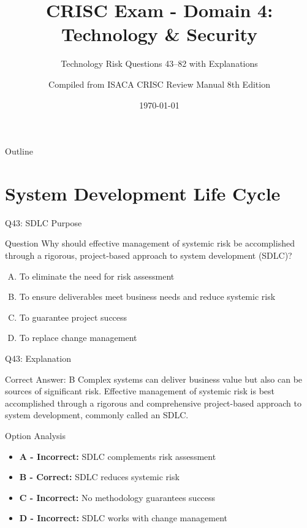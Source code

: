 \documentclass{beamer}
\title{CRISC Exam - Domain 4: Technology \& Security}
\subtitle{Technology Risk Questions 43--82 with Explanations}
\author{Compiled from ISACA CRISC Review Manual 8th Edition}
\date{\today}
\begin{document}
	
	\begin{frame}
		\titlepage
	\end{frame}
	
	\begin{frame}{Outline}
		\tableofcontents
	\end{frame}
	
	
	\section{System Development Life Cycle}
	
	\begin{frame}{Q43: SDLC Purpose}
		\begin{block}{Question}
			Why should effective management of systemic risk be accomplished through a rigorous, project-based approach to system development (SDLC)?
		\end{block}
		\begin{enumerate}[(A)]
			\item To eliminate the need for risk assessment
			\item To ensure deliverables meet business needs and reduce systemic risk
			\item To guarantee project success
			\item To replace change management
		\end{enumerate}
	\end{frame}
	
	\begin{frame}{Q43: Explanation}
		\begin{block}{Correct Answer: B}
			Complex systems can deliver business value but also can be sources of significant risk. Effective management of systemic risk is best accomplished through a rigorous and comprehensive project-based approach to system development, commonly called an SDLC.
		\end{block}
		\begin{block}{Option Analysis}
			\begin{itemize}
				\item \textbf{A - Incorrect:} SDLC complements risk assessment
				\item \textbf{B - Correct:} SDLC reduces systemic risk
				\item \textbf{C - Incorrect:} No methodology guarantees success
				\item \textbf{D - Incorrect:} SDLC works with change management
			\end{itemize}
		\end{block}
	\end{frame}
	
\end{document}
